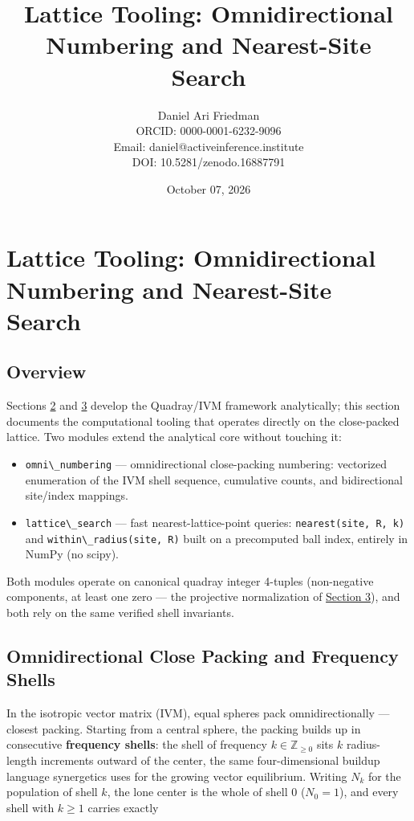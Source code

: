 \documentclass[
  10pt,
]{article}
\title{Lattice Tooling: Omnidirectional Numbering and Nearest-Site Search}
\author{Daniel Ari Friedman\\ ORCID: 0000-0001-6232-9096\\ Email: daniel@activeinference.institute\\ DOI: 10.5281/zenodo.16887791}
\date{October 07, 2026}
\newcommand{\passthrough}[1]{#1}
\providecommand{\tightlist}{%
  \setlength{\itemsep}{0pt}\setlength{\parskip}{0pt}}
\begin{document}
\maketitle

{
\hypersetup{linkcolor=black}
\setcounter{tocdepth}{3}
\tableofcontents
}
\section{Lattice Tooling: Omnidirectional Numbering and Nearest-Site
Search}\label{lattice-tooling-omnidirectional-numbering-and-nearest-site-search}

\subsection{Overview}\label{overview}

Sections \href{02_4d_namespaces.md}{2} and
\href{03_quadray_methods.md}{3} develop the Quadray/IVM framework
analytically; this section documents the computational tooling that
operates directly on the close-packed lattice. Two modules extend the
analytical core without touching it:

\begin{itemize}
\tightlist
\item
  \passthrough{\lstinline!omni\_numbering!} --- omnidirectional
  close-packing numbering: vectorized enumeration of the IVM shell
  sequence, cumulative counts, and bidirectional site/index mappings.
\item
  \passthrough{\lstinline!lattice\_search!} --- fast
  nearest-lattice-point queries:
  \passthrough{\lstinline!nearest(site, R, k)!} and
  \passthrough{\lstinline!within\_radius(site, R)!} built on a
  precomputed ball index, entirely in NumPy (no scipy).
\end{itemize}

Both modules operate on canonical quadray integer 4-tuples (non-negative
components, at least one zero --- the projective normalization of
\href{03_quadray_methods.md}{Section 3}), and both rely on the same
verified shell invariants.

\subsection{Omnidirectional Close Packing and Frequency
Shells}\label{omnidirectional-close-packing-and-frequency-shells}

In the isotropic vector matrix (IVM), equal spheres pack
omnidirectionally --- closest packing. Starting from a central sphere,
the packing builds up in consecutive \textbf{frequency shells}: the
shell of frequency \(k \in \mathbb{Z}_{\ge 0}\) sits \(k\) radius-length
increments outward of the center, the same four-dimensional buildup
language synergetics uses for the growing vector equilibrium. Writing
\(N_k\) for the population of shell \(k\), the lone center is the whole
of shell 0 (\(N_0 = 1\)), and every shell with \(k \ge 1\) carries
exactly
\end{document}
